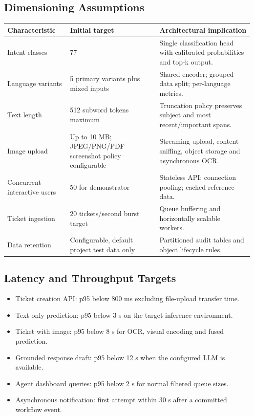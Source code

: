 \documentclass[10pt,letterpaper]{article}
\begin{document}
\subsection*{Dimensioning Assumptions}
\begin{table}[H]\centering\small
\begin{tabularx}{\textwidth}{|L{2.2in}|L{1.5in}|Y|}\hline
\textbf{Characteristic} & \textbf{Initial target} & \textbf{Architectural implication}\\\hline
Intent classes & 77 & Single classification head with calibrated probabilities and top-k output.\\\hline
Language variants & 5 primary variants plus mixed inputs & Shared encoder; grouped data split; per-language metrics.\\\hline
Text length & 512 subword tokens maximum & Truncation policy preserves subject and most recent/important spans.\\\hline
Image upload & Up to 10 MB; JPEG/PNG/PDF screenshot policy configurable & Streaming upload, content sniffing, object storage and asynchronous OCR.\\\hline
Concurrent interactive users & 50 for demonstrator & Stateless API; connection pooling; cached reference data.\\\hline
Ticket ingestion & 20 tickets/second burst target & Queue buffering and horizontally scalable workers.\\\hline
Data retention & Configurable, default project test data only & Partitioned audit tables and object lifecycle rules.\\\hline
\end{tabularx}
\end{table}

\subsection*{Latency and Throughput Targets}
\begin{itemize}
  \item Ticket creation API: p95 below 800 ms excluding file-upload transfer time.
  \item Text-only prediction: p95 below 3 s on the target inference environment.
  \item Ticket with image: p95 below 8 s for OCR, visual encoding and fused prediction.
  \item Grounded response draft: p95 below 12 s when the configured LLM is available.
  \item Agent dashboard queries: p95 below 2 s for normal filtered queue sizes.
  \item Asynchronous notification: first attempt within 30 s after a committed workflow event.
\end{itemize}
\end{document}

